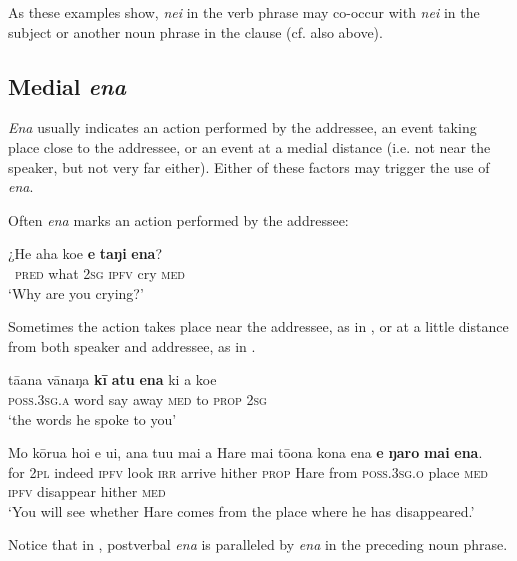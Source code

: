 As these examples show, \textit{nei} in the verb phrase may co-occur with \textit{nei} in the subject or another noun phrase in the clause (cf. also  above).

\subsection{Medial \textit{ena}}\label{sec:7.6.3}
\textit{Ena} usually indicates an action performed by the addressee, an event taking place close to the addressee, or an event at a medial distance (i.e. not near the speaker, but not very far either). Either of these factors may trigger the use of \textit{ena}.

Often \textit{ena} marks an action performed by the addressee:

\ea\label{ex:7.160}
\gll ¿He aha koe \textbf{e} \textbf{taŋi} \textbf{ena}? \\
~\textsc{pred} what \textsc{2sg} \textsc{ipfv} cry \textsc{med} \\

\glt
‘Why are you crying?’ \textstyleExampleref{[R229.185]} 
\z

Sometimes the action takes place near the addressee, as in , or at a little distance from both speaker and addressee, as in . 

\ea\label{ex:7.161}
\gll tā{\ꞌ}ana vānaŋa \textbf{kī} \textbf{atu} \textbf{ena} ki a koe \\
\textsc{poss.3sg.a} word say away \textsc{med} to \textsc{prop} \textsc{2sg} \\

\glt 
‘the words he spoke to you’ \textstyleExampleref{[R229.079]} 
\z

\ea\label{ex:7.162}
\gll Mo kōrua ho{\ꞌ}i e u{\ꞌ}i, ana tu{\ꞌ}u mai a Hare mai tō{\ꞌ}ona kona ena \textbf{e} \textbf{ŋaro} \textbf{mai} \textbf{ena}. \\
for \textsc{2pl} indeed \textsc{ipfv} look \textsc{irr} arrive hither \textsc{prop} Hare from \textsc{poss.3sg.o} place \textsc{med} \textsc{ipfv} disappear hither \textsc{med} \\

\glt
‘You will see whether Hare comes from the place where he has disappeared.’ \textstyleExampleref{[R229.276]} 
\z

Notice that in , postverbal \textit{ena} is paralleled by \textit{ena} in the preceding noun phrase.

